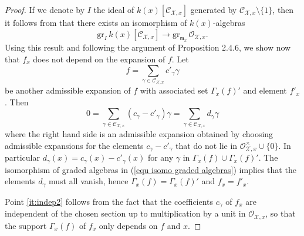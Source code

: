 \documentclass{amsart}%
\numberwithin{equation}{subsection}
\theoremstyle{plain2}
\theoremstyle{definition2}
\theoremstyle{stepstyle}
\theoremstyle{point}
\theoremstyle{subpoint}
\newcommand{\cX}{\ensuremath{\mathscr{X}}}
\newcommand{\caO}{\ensuremath{\mathcal{O}}}
\begin{document}
\begin{proof}
If we denote by $I$ the ideal of $k(x)[\mathcal{C}_{\cX,x}]$ generated by $\mathcal{C}_{\cX,x}\setminus \{1\}$, then it follows from \cite{Kato1994a} that there exists an isomorphism of $k(x)$-algebras \begin{equation} \label{equ isomo graded algebras}
\mathrm{gr}_I \,k(x)[\mathcal{C}_{\cX,x}]\to \mathrm{gr}_{\mathfrak{m}_x}\, \mathcal{O}_{\cX,x}.
\end{equation}
Using this result and following the argument of  \cite{MustataNicaise} Proposition 2.4.6, we show now that $f_x$ does not depend on the expansion of $f$. Let $$f=\sum_{\gamma \in \mathcal{C}_{\cX,x}}c'_{\gamma}\gamma$$ be another admissible expansion of $f$ with associated set $\Gamma_x(f)'$ and element $f'_x$. Then $$0=\sum_{\gamma \in \mathcal{C}_{\cX,x}}(c_{\gamma}- c'_\gamma)\gamma =\sum_{\gamma \in \mathcal{C}_{\cX,x}}d_{\gamma}\gamma$$ where the right hand side is an admissible expansion obtained by choosing admissible expansions for the elements $c_\gamma-c'_\gamma$ that do not lie in $\caO_{\cX,x}^\times \cup \{0\}$. In particular $d_\gamma(x)= c_\gamma(x)-c'_\gamma(x)$ for any $\gamma$ in $ \Gamma_x(f) \cup\Gamma_x(f)'$. The isomorphism of graded algebras in (\ref{equ isomo graded algebras}) implies that the elements $d_\gamma$ must all vanish, hence $\Gamma_x(f) = \Gamma_x(f)'$ and $f_x=f'_x$.  

Point \eqref{it:indep2} follows from the fact that the coefficients $c_\gamma$ of $f_x$ are independent of the chosen section up to multiplication by a unit in $\mathcal{O}_{\cX,x}$, so that the support $\Gamma_x(f)$ of $f_x$ only depends on $f$ and $x$.
\end{proof}
\end{document}
